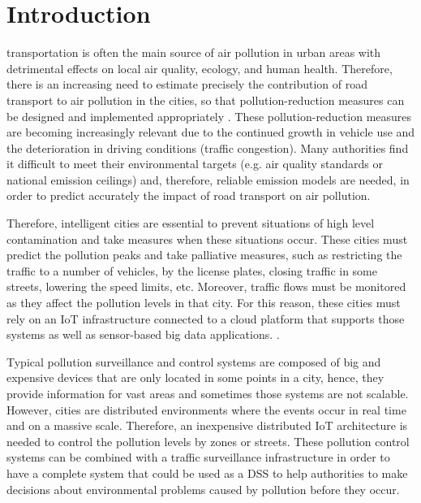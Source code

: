 
\chapter{Introduction} %
 transportation is often the main source of air pollution in urban areas with detrimental effects on local air quality, ecology, and human health. Therefore, there is an increasing need to estimate precisely the contribution of road transport to air pollution in the cities, so that pollution-reduction measures can be designed and implemented appropriately \cite{SNB10}. These pollution-reduction measures are becoming increasingly relevant due to the continued growth in vehicle use and the deterioration in driving conditions (traffic congestion). Many authorities find it difficult to meet their environmental targets (e.g. air quality standards or national emission ceilings) and, therefore, reliable emission models are needed, in order to predict accurately the impact of road transport on air pollution.

Therefore, intelligent cities are essential to prevent situations of high level contamination and take measures when these situations occur. These cities must predict the pollution peaks and take palliative measures, such as restricting the traffic to a number of vehicles, by the license plates, closing traffic in some streets, lowering the speed limits, etc. Moreover, traffic flows must be monitored as they affect the pollution levels in that city. For this reason, these cities must rely on an \ac{IoT} infrastructure connected to a cloud platform that supports those systems as well as sensor-based big data applications. \cite{Bib18}.

Typical pollution surveillance and control systems are composed of big and expensive devices that are only located in some points in a city, hence, they provide information for vast areas and sometimes those systems are not scalable. However, cities are distributed environments where the events occur in real time and on a massive scale. Therefore, an inexpensive distributed IoT architecture is needed to control the pollution levels by zones or streets. These pollution control systems can be combined with a traffic surveillance infrastructure in order to have a complete system that could be used as a \ac{DSS} to help authorities to make decisions about environmental problems caused by pollution before they occur.

